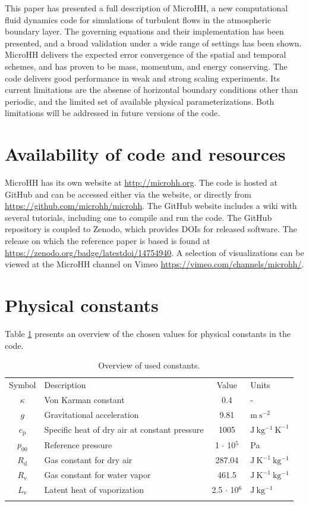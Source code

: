 \documentclass[gmd,manuscript]{copernicus}
\begin{document}
\conclusions  \label{sec:conclusion} %
This paper has presented a full description of MicroHH, a new computational fluid dynamics code for simulations of turbulent flows in the atmospheric boundary layer. The governing equations and their implementation has been presented, and a broad validation under a wide range of settings has been shown. MicroHH delivers the expected error convergence of the spatial and temporal schemes, and has proven to be mass, momentum, and energy conserving. The code delivers good performance in weak and strong scaling experiments. Its current limitations are the absense of horizontal boundary conditions other than periodic, and the limited set of available physical parameterizations. Both limitations will be addressed in future versions of the code.

\section{Availability of code and resources}\label{sec:howto}
MicroHH has its own website at \url{http://microhh.org}. The code is hosted at GitHub and can be accessed either via the website, or directly from 
\url{https://github.com/microhh/microhh}. The GitHub website includes a wiki with several tutorials, including one to compile and run the code. The GitHub repository is coupled to Zenodo, which provides DOIs for released software. The release on which the reference paper is based is found at \url{https://zenodo.org/badge/latestdoi/14754940}. A selection of visualizations can be viewed at the MicroHH channel on Vimeo \url{https://vimeo.com/channels/microhh/}.

\appendix \section{Physical constants}
Table \ref{tab:constants} presents an overview of the chosen values for physical constants in the code.
\begin{table}[t]
\caption{Overview of used constants.}\label{tab:constants}
\begin{tabular}{clcl}
\tophline
Symbol & Description & Value & Units \\
\middlehline
$\kappa$ & Von Karman constant & 0.4 & -\\
$g$ & Gravitational acceleration & 9.81 & $\mathrm{m~s^{-2}}$\\
$c_\mathrm{p}$ & Specific heat of dry air at constant pressure & 1005 & $\mathrm{J~kg^{-1}~K^{-1}}$\\
$p_\mathrm{00}$ & Reference pressure & 1 $\cdot$ 10$^5$ & Pa\\
$R_\mathrm{d}$ & Gas constant for dry air & 287.04 & $\mathrm{J~K^{-1}~kg^{-1}}$\\
$R_\mathrm{v}$ & Gas constant for water vapor & 461.5 & $\mathrm{J~K^{-1}~kg^{-1}}$\\
$L_\mathrm{v}$ & Latent heat of vaporization & 2.5 $\cdot$ 10$^6$ & $\mathrm{J~kg^{-1}}$\\
\bottomhline
\end{tabular}
\end{table}
\end{document}
